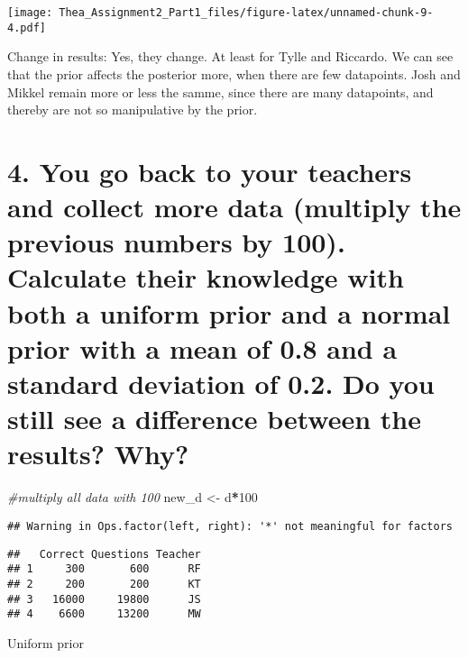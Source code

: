 \documentclass[]{article}
\newenvironment{Shaded}{\begin{snugshade}}{\end{snugshade}}
\newcommand{\DecValTok}[1]{\textcolor[rgb]{0.00,0.00,0.81}{#1}}
\newcommand{\StringTok}[1]{\textcolor[rgb]{0.31,0.60,0.02}{#1}}
\newcommand{\CommentTok}[1]{\textcolor[rgb]{0.56,0.35,0.01}{\textit{#1}}}
\newcommand{\OperatorTok}[1]{\textcolor[rgb]{0.81,0.36,0.00}{\textbf{#1}}}
\newcommand{\NormalTok}[1]{#1}
\begin{document}
\texttt{[image: Thea\_Assignment2\_Part1\_files/figure-latex/unnamed-chunk-9-4.pdf]}

Change in results: Yes, they change. At least for Tylle and Riccardo. We
can see that the prior affects the posterior more, when there are few
datapoints. Josh and Mikkel remain more or less the samme, since there
are many datapoints, and thereby are not so manipulative by the prior.

\section{4. You go back to your teachers and collect more data (multiply
the previous numbers by 100). Calculate their knowledge with both a
uniform prior and a normal prior with a mean of 0.8 and a standard
deviation of 0.2. Do you still see a difference between the results?
Why?}\label{you-go-back-to-your-teachers-and-collect-more-data-multiply-the-previous-numbers-by-100.-calculate-their-knowledge-with-both-a-uniform-prior-and-a-normal-prior-with-a-mean-of-0.8-and-a-standard-deviation-of-0.2.-do-you-still-see-a-difference-between-the-results-why}

\begin{Shaded}
\begin{Highlighting}[]
\CommentTok{#multiply all data with 100}
\NormalTok{new_d <-}\StringTok{ }\NormalTok{d}\OperatorTok{*}\DecValTok{100}
\end{Highlighting}
\end{Shaded}

\begin{verbatim}
## Warning in Ops.factor(left, right): '*' not meaningful for factors
\end{verbatim}

\begin{Shaded}
\end{Shaded}

\begin{verbatim}
##   Correct Questions Teacher
## 1     300       600      RF
## 2     200       200      KT
## 3   16000     19800      JS
## 4    6600     13200      MW
\end{verbatim}

Uniform prior
\end{document}
